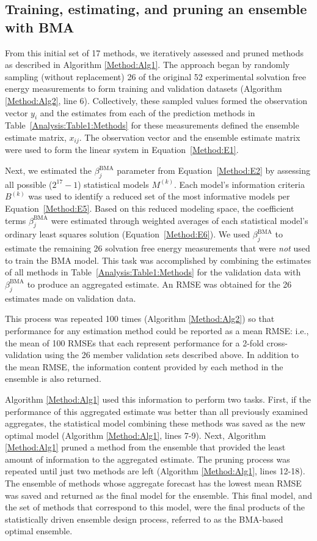 \documentclass[journal=jpcbfk, manuscript=article]{achemso}
\newcommand{\+}[1]{\ensuremath{\mathbf{#1}}}
\begin{document}
 
 \subsection{Training, estimating, and pruning an ensemble with BMA} \label{EP:training}
From this initial set of 17 methods, we iteratively assessed and pruned methods as described in Algorithm \ref{Method:Alg1}.
The approach began by randomly sampling (without replacement) 26 of the original 52 experimental solvation free energy measurements to form training and validation datasets (Algorithm \ref{Method:Alg2}, line 6).
Collectively, these sampled values formed the observation vector $y_i$ and the estimates from each of the prediction methods in Table~\ref{Analysis:Table1:Methods} for these measurements defined the ensemble estimate matrix, $x_{i j}$.
The observation vector and the ensemble estimate matrix were used to form the linear system in Equation~\ref{Method:E1}.  

Next, we estimated the $\beta_j^{\text{BMA}}$ parameter from Equation~\ref{Method:E2} by assessing all possible ($2^{17} -1$) statistical models $M^{(k)}$.
Each model's information criteria $B^{(k)}$ was used to identify a reduced set of the most informative models per Equation~\ref{Method:E5}.
Based on this reduced modeling space, the coefficient terms $\beta_j^{\text{BMA}}$ were estimated through weighted averages of each statistical model's ordinary least squares solution (Equation~\ref{Method:E6}).
We used $\beta_j^{\text{BMA}}$ to estimate the remaining 26 solvation free energy measurements that were \emph{not} used to train the BMA model.
This task was accomplished by combining the estimates of all methods in Table~\ref{Analysis:Table1:Methods} for the validation data with $\beta_j^{\text{BMA}}$ to produce an aggregated estimate. 
An RMSE was obtained for the 26 estimates made on validation data.

This process was repeated 100 times (Algorithm \ref{Method:Alg2}) so that performance for any estimation method could be reported as a mean RMSE: i.e., the mean of 100 RMSEs that each represent performance for a 2-fold cross-validation using the 26 member validation sets described above.
In addition to the mean RMSE, the information content provided by each method in the ensemble is also returned. 

Algorithm \ref{Method:Alg1} used this information to perform two tasks.
First, if the performance of this aggregated estimate was better than all previously examined aggregates, the statistical model combining these methods was saved as the new optimal model (Algorithm \ref{Method:Alg1}, lines 7-9).
Next, Algorithm \ref{Method:Alg1} pruned a method from the ensemble that provided the least amount of information to the aggregated estimate.
The pruning process was repeated until just two methods are left (Algorithm \ref{Method:Alg1}, lines 12-18).
The ensemble of methods whose aggregate forecast has the lowest mean RMSE was saved and returned as the final model for the ensemble.
This final model, and the set of methods that correspond to this model, were the final products of the statistically driven ensemble design process, referred to as the BMA-based optimal ensemble.
\end{document}
